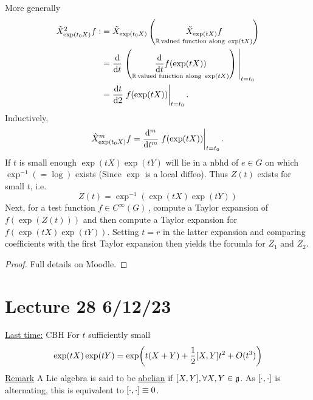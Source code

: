 \documentclass[12pt,a4paper]{article}
\newcommand{\rR}{\ensuremath{\mathbb{R}\,}}
\newcommand{\cinfn}[1]{\ensuremath{C^{\infty}(#1)\,}}
\newcommand{\lalg}{\ensuremath{\mathfrak{g}}}
\newcommand{\ul}[1]{\underline{#1}}
\newcommand{\ecomm}{\ensuremath{\comm{\cdot}{\cdot}}}
\begin{document}
More generally 
\begin{align*}
\tilde{X}_{\exp(t_0 X)}^2 f:&=\tilde{X}_{\exp(t_0 X)}\left(\underset{\rR \text{valued function along } \exp(tX)}{\tilde{X}_{\exp(t X)}f}\right)\\
&= \dv{t}\eval{\left(\underset{\rR \text{valued function along } \exp(tX)}{\dv{t}f(\exp(tX))}\right)}_{t=t_0}\\
&= \dv{t}{2}\eval{f(\exp(tX))}_{t=t_0}.
\end{align*}
Inductively, 
\[\tilde{X}_{\exp(t_0 X)}^m f= \dv[m]{t}\eval{f(\exp(tX))}_{t=t_0}.\]
If $t$ is small enough $\exp(tX)\exp(tY)$ will lie in a nbhd of $e\in G$ on which $\exp^{-1} (=\log)$ exists (Since $\exp$ is a local diffeo). Thus $Z(t)$ exists for small $t$, i.e.
\[Z(t)=\exp^{-1}(\exp(tX)\exp(tY))\]
Next, for a test function $f\in \cinfn{G}$, compute a Taylor expansion of $f(\exp(Z(t)))$ and then compute a Taylor expansion for $f(\exp(tX)\exp(tY))$. Setting $t=r$ in the latter expansion and comparing coefficients with the first Taylor expansion then yields the forumla for $Z_1$ and $Z_2$.
\begin{proof}
Full details on Moodle.
\end{proof}

\section{Lecture 28 6/12/23}
\ul{Last time:} CBH For $t$ sufficiently small
\[\exp(tX)\exp(tY)=\exp(t(X+Y)+\frac{1}{2}\comm{X}{Y}t^2+O(t^3))\]
\ul{Remark} A Lie algebra is said to be \ul{abelian} if $\comm{X}{Y}, \forall X,Y \in \lalg$. As $\ecomm$ is alternating, this is equivalent to $\ecomm \equiv 0$.
\end{document}
